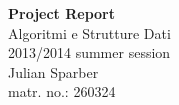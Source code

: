 \documentclass[11pt, a4paper, titlepage, block]{article}
\begin{document}
\begin{titlepage}

\newcommand{\HRule}{\rule{\linewidth}{0.5mm}} %

\center %
 




{ \huge \bfseries Project Report}\\[1.2cm]

{\LARGE Algoritmi e Strutture Dati}\\[0.5cm]
{\large 2013/2014 summer session}
\\[1.5cm]

{\large Julian Sparber}\\[0.2cm]
{\large matr. no.: 260324}\\[1cm]





 

\newpage

\end{titlepage}
\end{document}
